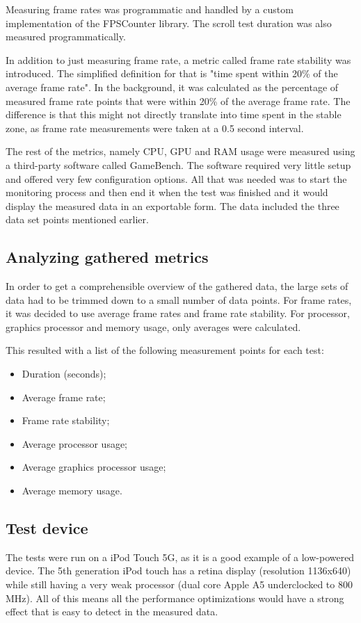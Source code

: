 \documentclass[a4paper,12pt]{article}
\begin{document}
Measuring frame rates was programmatic and handled by a custom implementation of the FPSCounter\cite{FPSCounterGithub} library. The scroll test duration was also measured programmatically.

In addition to just measuring frame rate, a metric called frame rate stability was introduced. The simplified definition for that is "time spent within 20\% of the average frame rate". In the background, it was calculated as the percentage of measured frame rate points that were within 20\% of the average frame rate. The difference is that this might not directly translate into time spent in the stable zone, as frame rate measurements were taken at a 0.5 second interval.

The rest of the metrics, namely CPU, GPU and RAM usage were measured using a third-party software called GameBench\cite{GameBenchHome}. The software required very little setup and offered very few configuration options. All that was needed was to start the monitoring process and then end it when the test was finished and it would display the measured data in an exportable form. The data included the three data set points mentioned earlier.

\subsection{Analyzing gathered metrics}
In order to get a comprehensible overview of the gathered data, the large sets of data had to be trimmed down to a small number of data points. For frame rates, it was decided to use average frame rates and frame rate stability. For processor, graphics processor and memory usage, only averages were calculated.

This resulted with a list of the following measurement points for each test:
\begin{itemize}
  \item Duration (seconds);
  \item Average frame rate;
  \item Frame rate stability;
  \item Average processor usage;
  \item Average graphics processor usage;
  \item Average memory usage.
\end{itemize}

\subsection{Test device}
The tests were run on a iPod Touch 5G, as it is a good example of a low-powered device. The 5th generation iPod touch has a retina display (resolution 1136x640)\cite{AppleIPodTouch5G} while still having a very weak processor (dual core Apple A5 underclocked to 800 MHz)\cite{MacObserverUnderclock}. All of this means all the performance optimizations would have a strong effect that is easy to detect in the measured data.
\end{document}
